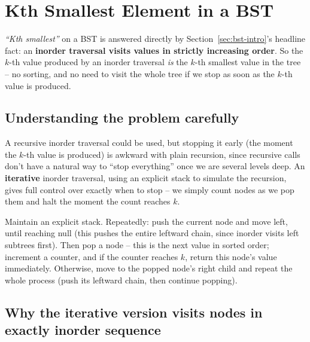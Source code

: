 \section{Kth Smallest Element in a BST}
\label{sec:bst-kth-smallest}


\begin{patternbox}
\emph{``Kth smallest''} on a BST is answered directly by
Section~\ref{sec:bst-intro}'s headline fact: an \textbf{inorder
traversal visits values in strictly increasing order}. So the $k$-th
value produced by an inorder traversal \emph{is} the $k$-th smallest
value in the tree -- no sorting, and no need to visit the whole tree if
we stop as soon as the $k$-th value is produced.
\end{patternbox}

\subsection*{Understanding the problem carefully}

A recursive inorder traversal could be used, but stopping it early (the
moment the $k$-th value is produced) is awkward with plain recursion,
since recursive calls don't have a natural way to ``stop everything''
once we are several levels deep. An \textbf{iterative} inorder traversal,
using an explicit stack to simulate the recursion, gives full control over
exactly when to stop -- we simply count nodes as we pop them and halt the
moment the count reaches $k$.

\begin{ideabox}
Maintain an explicit stack. Repeatedly: push the current node and move
left, until reaching null (this pushes the entire leftward chain, since
inorder visits left subtrees first). Then pop a node -- this is the next
value in sorted order; increment a counter, and if the counter reaches
$k$, return this node's value immediately. Otherwise, move to the popped
node's right child and repeat the whole process (push its leftward
chain, then continue popping).
\end{ideabox}

\subsection*{Why the iterative version visits nodes in exactly inorder sequence}

